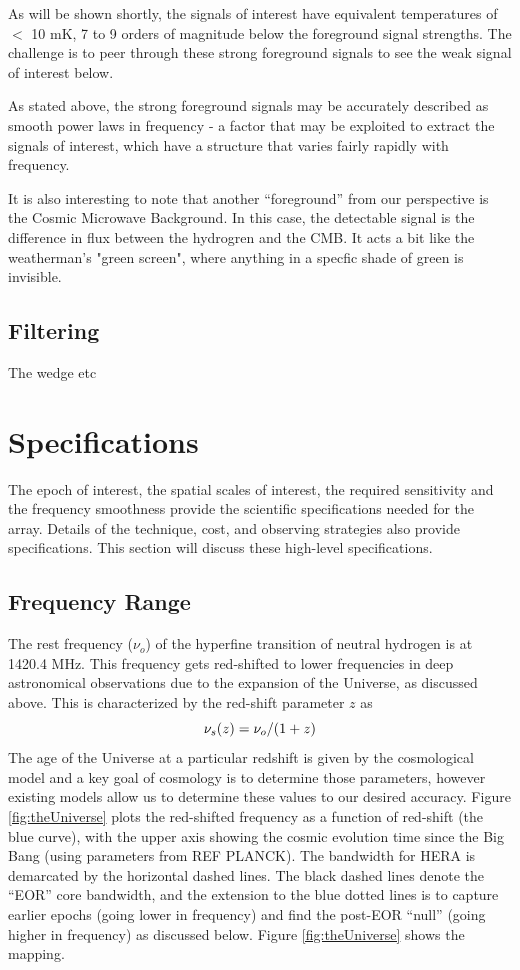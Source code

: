\documentclass[ars]{copernicus}
\begin{document}
As will be shown shortly, the signals of interest have equivalent temperatures of $<$ 10 mK, 7 to 9 
orders of magnitude below the foreground signal strengths.  The challenge is to peer through these
strong foreground signals to see the weak signal of interest below.

As stated above, the strong foreground signals may be accurately described as smooth power laws in 
frequency - a factor that may be exploited to extract the signals of interest, which have a structure
that varies fairly rapidly with frequency.

It is also interesting to note that another ``foreground'' from our perspective is the Cosmic Microwave Background.  
In this case, the detectable signal is the difference in flux between the hydrogren and the CMB.  It acts a bit like the
weatherman's "green screen", where anything in a specfic shade of green is invisible.

\subsection{Filtering}
The wedge etc

\section{Specifications}
\label{sec:spec}
The epoch of interest, the spatial scales of interest, the required sensitivity and
the frequency smoothness provide the scientific specifications needed for the array.
Details of the technique, cost, and observing strategies also provide specifications.
This section will discuss these high-level specifications.

\subsection{Frequency Range}
The rest frequency ($\nu_o$) of the hyperfine transition of neutral hydrogen is at
1420.4 MHz. This frequency gets red-shifted to lower frequencies in deep astronomical
observations due to the expansion of the Universe, as discussed above. This is
characterized by the red-shift parameter $z$ as
\begin{equation}
\centering
\label{eq:redshift}
\nu_s(z) = \nu_o/(1+z)
\end{equation}
The age of the Universe at a particular redshift is given by the cosmological model
and a key goal of cosmology is to determine those parameters, however existing models
allow us to determine these values to our desired accuracy. Figure
\ref{fig:theUniverse} plots the red-shifted frequency as a function of red-shift (the
blue curve), with the upper axis showing the cosmic evolution time since the Big Bang
(using parameters from REF PLANCK). The bandwidth for HERA is demarcated by the
horizontal dashed lines. The black dashed lines denote the ``EOR'' core bandwidth,
and the extension to the blue dotted lines is to capture earlier epochs (going lower
in frequency) and find the post-EOR ``null'' (going higher in frequency) as discussed
below. Figure \ref{fig:theUniverse} shows the mapping.
\end{document}
